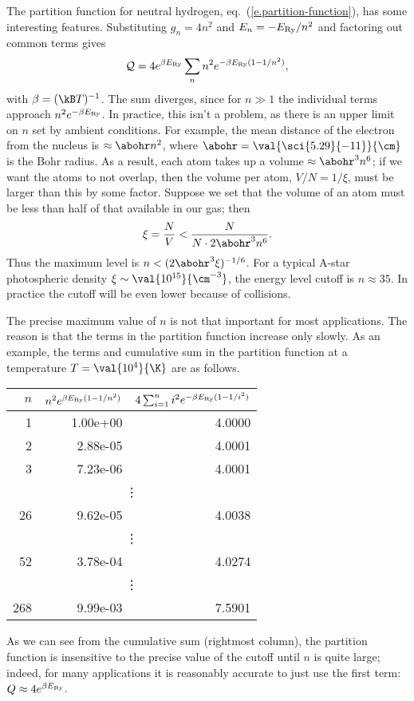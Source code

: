 \begin{sidebar}
\label{sb.partition-function}
The partition function for neutral hydrogen, eq.~(\ref{e.partition-function}), has some interesting features. Substituting $g_{n}=4n^{2}$ and $E_{n} = -E_{\mathrm{Ry}}/n^{2}$ and factoring out common terms gives
\[	\mathcal{Q} = 4e^{\beta E_{\mathrm{Ry}}}\sum_{n} n^{2} e^{-\beta E_{\mathrm{Ry}}(1-1/n^{2})}, \]
with $\beta = (\kB T)^{-1}$. The sum diverges, since for $n\gg 1$ the individual terms approach $n^{2}e^{-\beta E_{\mathrm{Ry}}}$. In practice, this isn't a problem, as there is an upper limit on $n$ set by ambient conditions. For example, the mean distance of the electron from the nucleus is $\approx \abohr n^{2}$, where $\abohr = \val{\sci{5.29}{-11}}{\cm}$ is the Bohr radius. As a result, each atom takes up a volume $\approx \abohr^{3}n^{6}$; if we want the atoms to not overlap, then the volume per atom, $V/N = 1/\xi$, must be larger than this by some factor. Suppose we set that the volume of an atom must be less than half of that available in our gas; then
\[
\xi = \frac{N}{V} < \frac{N}{N\cdot 2\abohr^{3}n^{6}}.
\]
Thus the maximum level is $n < (2\abohr^{3}\xi)^{-1/6}$. For a typical A-star photospheric density $\xi\sim \val{10^{15}}{\cm^{-3}}$, the energy level cutoff is $n \approx 35$. In practice the cutoff will be even lower because of collisions.

The precise maximum value of $n$ is not that important for most applications. The reason is that the terms in the partition function increase only slowly. As an example, the terms and cumulative sum in the partition function at a temperature $T=\val{10^{4}}{\K}$ are as follows.
\begin{center}
\begin{tabular}{rrr}
$n$ & $n^{2} e^{\beta E_{\mathrm{Ry}}(1-1/n^{2})}$ & $4\sum_{i=1}^{n} i^{2}e^{-\beta E_{\mathrm{Ry}}(1-1/i^{2})}$ \\
\hline
   1 & 1.00e+00 &  4.0000 \\
   2 & 2.88e-05 &  4.0001 \\
   3 & 7.23e-06 &  4.0001 \\
  \multicolumn{3}{c}{\vdots} \\
  26 & 9.62e-05 &  4.0038 \\
  \multicolumn{3}{c}{\vdots} \\
  52 & 3.78e-04 &  4.0274 \\
  \multicolumn{3}{c}{\vdots} \\
 268 & 9.99e-03 &  7.5901 \\
\end{tabular}
\end{center}
As we can see from the cumulative sum (rightmost column), the partition function is insensitive to the precise value of the cutoff until $n$ is quite large; indeed, for many applications it is reasonably accurate to just use the first term: $Q\approx 4e^{\beta E_{\mathrm{Ry}}}$. 
\end{sidebar}

